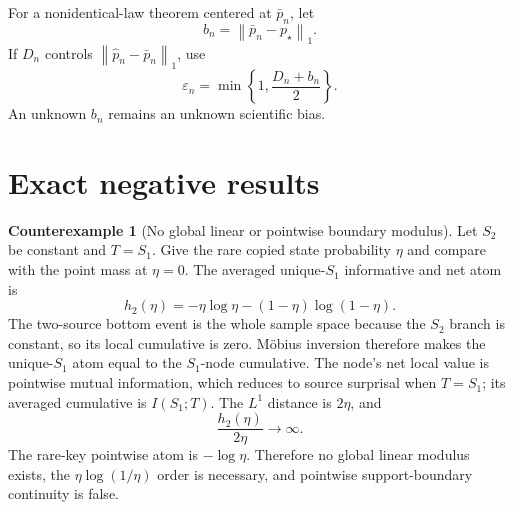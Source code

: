 \documentclass[11pt]{article}
\theoremstyle{definition}
\newtheorem{counterexample}[theorem]{Counterexample}
\newcommand{\normone}[1]{\left\lVert #1\right\rVert_1}
\begin{document}
For a nonidentical-law theorem centered at \(\bar p_n\), let
\begin{equation}
  b_n=\normone{\bar p_n-p_\star}.
\end{equation}
If \(D_n\) controls \(\normone{\widehat p_n-\bar p_n}\), use
\begin{equation}
  \varepsilon_n
  =
  \min\left\{1,\frac{D_n+b_n}{2}\right\}.
\end{equation}
An unknown \(b_n\) remains an unknown scientific bias.

\section{Exact negative results}

\begin{counterexample}[No global linear or pointwise boundary modulus]
Let \(S_2\) be constant and \(T=S_1\).  Give the rare copied state probability \(\eta\) and compare
with the point mass at \(\eta=0\).  The averaged unique-\(S_1\) informative and net atom is
\begin{equation}
  h_2(\eta)
  =
  -\eta\log\eta-(1-\eta)\log(1-\eta).
\end{equation}
The two-source bottom event is the whole sample space because the \(S_2\) branch is constant, so
its local cumulative is zero.  M{\"o}bius inversion therefore makes the unique-\(S_1\) atom equal
to the \(S_1\)-node cumulative.  The node's net local value is pointwise mutual information, which
reduces to source surprisal when \(T=S_1\); its averaged cumulative is \(I(S_1;T)\).
The \(L^1\) distance is \(2\eta\), and
\begin{equation}
  \frac{h_2(\eta)}{2\eta}\longrightarrow\infty.
\end{equation}
The rare-key pointwise atom is \(-\log\eta\).  Therefore no global linear modulus exists, the
\(\eta\log(1/\eta)\) order is necessary, and pointwise support-boundary continuity is false.
\end{counterexample}
\end{document}
